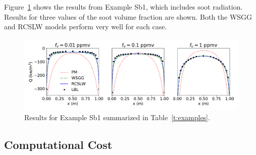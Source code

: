 \documentclass[preprint,12pt, a4paper]{elsarticle}
\begin{document}
Figure~\ref{f:exSb1} shows the results from Example Sb1, which includes soot radiation. Results for three values of the soot volume fraction are shown. Both the WSGG and RCSLW models perform very well for each case. 
%
\begin{figure}
    \begin{center}
        \includegraphics[width=5.5 in]{ex_Sb1.pdf}
    \caption{Results for Example Sb1 summarized in Table~\ref{t:examples}.}
    \label{f:exSb1}
    \end{center}
\end{figure}
%


\subsection{Computational Cost} \label{s:cost}
\end{document}
